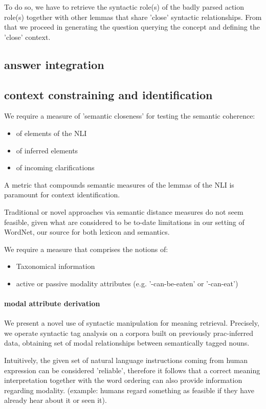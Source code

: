 \documentclass[10pt,a4paper]{article}
\begin{document}
To do so, we have to retrieve the syntactic role(s) of the badly parsed action role(s) together with other lemmas 
that share 'close' syntactic relationships.
From that we proceed in generating the question querying the concept and defining the 'close' context.

\subsection{answer integration}

\subsection{context constraining and identification}
We require a measure of 'semantic closeness' for testing the semantic coherence:

\begin{itemize}
 \item of elements of the NLI
 \item of inferred elements
 \item of incoming clarifications
\end{itemize}

A metric that compounds semantic measures of the 
lemmas of the NLI is paramount for 
context identification.

Traditional or novel approaches via semantic distance 
measures do not seem feasible, given what are considered 
to be to-date limitations in our setting of WordNet,
our source for both lexicon and semantics.

We require a measure that comprises the notions of:
\begin{itemize}
 \item Taxonomical information
 \item active or passive modality attributes (e.g. '-can-be-eaten' or '-can-eat')
\end{itemize}

\paragraph{modal attribute derivation}
We present a novel use of syntactic manipulation for meaning
retrieval.
Precisely, we operate syntactic tag analysis on a corpora built
on previously prac-inferred data, obtaining set of modal 
relationships between semantically tagged nouns.


Intuitively, the given set of natural language instructions 
coming from human expression can be considered 'reliable',
therefore it follows that a correct meaning interpretation
together with the word ordering can also provide information 
regarding modality.
(example: humans regard something as feasible if they have
already hear about it or seen it).\\
\end{document}
